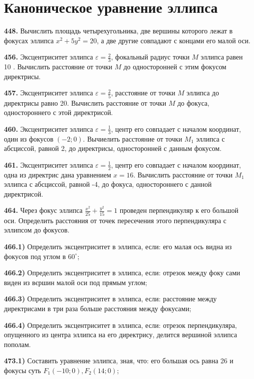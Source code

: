 \section{Каноническое уравнение эллипса}



\textbf{448.} Вычислить площадь четырехугольника, две вершины которого лежат в фокусах эллипса $x^2+5 y^2=20$, а две другие совпадают с концами его малой оси.

\textbf{456.} Эксцентриситет эллипса $\varepsilon=\frac{2}{3}$, фокальный радиус точки $M$ эллипса равен 10 . Вычислить расстояние от точки $M$ до односторонней с этим фокусом директрисы.

\textbf{457.} Эксцентриситет эллипса $\varepsilon=\frac{2}{5}$, расстояние от точки $M$ эллипса до директрисы равно 20. Вычислить расстояние от точки $M$ до фокуса, одностороннего с этой директрисой.

\textbf{460.} Эксцентриситет эллипса $\varepsilon=\frac{1}{3}$, центр его совпадает с началом координат, один из фокусов $(-2 ; 0)$. Вычиелить расстояние от точки $M_1$ эллипса с абсциссой, равной 2, до директрисы, односторонней с данным фокусом.

\textbf{461.} Эксцентриситет эллипса $\varepsilon=\frac{1}{2}$, центр его совпадает с началом координат, одна из директрис дана уравнением $x=16$. Вычислить расстояние от точки $M_1$ эллипса с абсциссой, равной -4, до фокуса, одностороннего с данной директрисой.

\textbf{464.} Через фокус эллипса $\frac{x^2}{25}+\frac{y^2}{15}=1$ проведен перпендикуляр к его большой оси. Определить расстояния от точек пересечения этого перпендикуляра с эллипсом до фокусов.

\textbf{466.1)} Определить эксцентриситет в эллипса, если: его малая ось видна из фокусов под углом в $60^{\circ}$;

\textbf{466.2)} Определить эксцентриситет в эллипса, если: отрезок между фоку сами виден из вєршин малой оси под прямым углом;

\textbf{466.3)} Определить эксцентриситет в эллипса, если: расстояние между директрисами в три раза больше расстояния между фокусами;

\textbf{466.4)} Определить эксцентриситет в эллипса, если: отрезок перпендикуляра, опущенного из центра эллипса на его директрису, делится вершиной эллипса пополам.

\textbf{473.1)} Составить уравнение эллипса, зная, что: его большая ось равна 26 и фокусы суть $F_1(-10 ; 0), F_2(14 ; 0)$;

